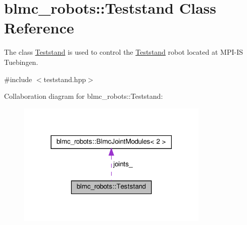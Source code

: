 \hypertarget{classblmc__robots_1_1Teststand}{}\section{blmc\+\_\+robots\+:\+:Teststand Class Reference}
\label{classblmc__robots_1_1Teststand}


The class \hyperlink{classblmc__robots_1_1Teststand}{Teststand} is used to control the \hyperlink{classblmc__robots_1_1Teststand}{Teststand} robot located at M\+P\+I-\/\+IS Tuebingen.  




{\ttfamily \#include $<$teststand.\+hpp$>$}



Collaboration diagram for blmc\+\_\+robots\+:\+:Teststand\+:
\nopagebreak
\begin{figure}[H]
\begin{center}
\leavevmode
\includegraphics[width=259pt]{classblmc__robots_1_1Teststand__coll__graph}
\end{center}
\end{figure}
